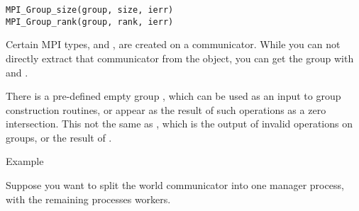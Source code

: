 \begin{lstlisting}
MPI_Group_size(group, size, ierr)
MPI_Group_rank(group, rank, ierr)
\end{lstlisting}

Certain MPI types,  and ,
are created on a communicator.
While you can not directly extract that communicator from the object,
you can get the group with
 and .

There is a pre-defined empty group ,
which can be used as an input to group construction routines,
or appear as the result of such operations as a zero intersection.
This not the same as ,
which is the output of invalid operations on groups,
or the result of .

 {Example}

Suppose you want to split the world communicator into
one manager process, with the remaining processes workers.
%
